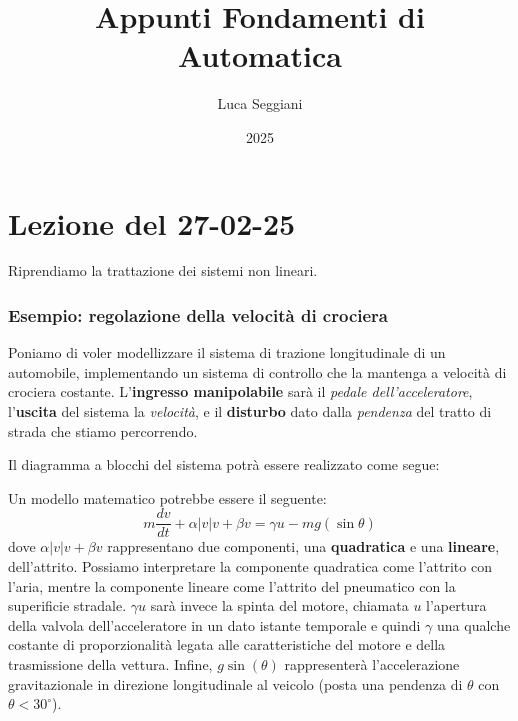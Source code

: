 \documentclass[a4paper,11pt]{article}
\title{Appunti Fondamenti di Automatica}
\author{Luca Seggiani}
\date{2025}
\begin{document}
\section{Lezione del 27-02-25}

\thispagestyle{empty}
\pagestyle{fancy}

Riprendiamo la trattazione dei sistemi non lineari.

\subsubsection{Esempio: regolazione della velocità di crociera}
Poniamo di voler modellizzare il sistema di trazione longitudinale di un automobile, implementando un sistema di controllo che la mantenga a velocità di crociera costante.
L'\textbf{ingresso manipolabile} sarà il \textit{pedale dell'acceleratore}, l'\textbf{uscita} del sistema la \textit{velocità}, e il \textbf{disturbo} dato dalla \textit{pendenza} del tratto di strada che stiamo percorrendo.

Il diagramma a blocchi del sistema potrà essere realizzato come segue:

\begin{center}
\end{center}

Un modello matematico potrebbe essere il seguente:
$$
m \frac{dv}{dt} + \alpha |v|v + \beta v = \gamma u - m g (\sin{\theta})
$$
dove $\alpha |v|v + \beta v$ rappresentano due componenti, una \textbf{quadratica} e una \textbf{lineare}, dell'attrito.
Possiamo interpretare la componente quadratica come l'attrito con l'aria, mentre la componente lineare come l'attrito del pneumatico con la superificie stradale.
$\gamma u$ sarà invece la spinta del motore, chiamata $u$ l'apertura della valvola dell'acceleratore in un dato istante temporale e quindi $\gamma$ una qualche costante di proporzionalità legata alle caratteristiche del motore e della trasmissione della vettura.
Infine, $g\sin(\theta)$ rappresenterà l'accelerazione gravitazionale in direzione longitudinale al veicolo (posta una pendenza di $\theta$ con $\theta < 30^\circ$).
\end{document}
